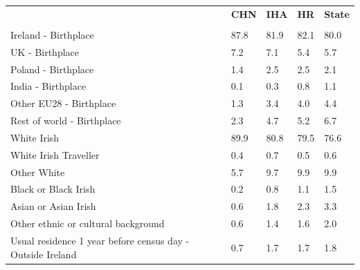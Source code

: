 \documentclass{article}
\begin{document}
\pagebreak
\begin{table}[h]	
\centering
		\begin{tabular}{KTTTT}
  \hline
& \textbf{CHN} & \textbf{IHA} & \textbf{HR}& \textbf{State}\\ 
  \hline
    \\ 
    \hline
Ireland - Birthplace & 87.8& 81.9& 82.1& 80.0\\
UK - Birthplace & 7.2& 7.1& 5.4& 5.7\\
Poland - Birthplace & 1.4& 2.5& 2.5& 2.1\\
India - Birthplace & 0.1& 0.3& 0.8& 1.1\\
Other EU28 - Birthplace & 1.3& 3.4& 4.0& 4.4\\
Rest of world - Birthplace & 2.3& 4.7& 5.2& 6.7\\
    \hline
White Irish & 89.9& 80.8& 79.5& 76.6\\
White Irish Traveller & 0.4& 0.7& 0.5& 0.6\\
Other White & 5.7& 9.7& 9.9& 9.9\\
Black or Black Irish & 0.2& 0.8& 1.1& 1.5\\
Asian or Asian Irish & 0.6& 1.8& 2.3& 3.3\\
Other ethnic or cultural background & 0.6& 1.4& 1.6& 2.0\\
    \hline
Usual residence 1 year before census day - Outside Ireland & 0.7& 1.7& 1.7& 1.8\\


\end{tabular}
\end{table}
\end{document}
